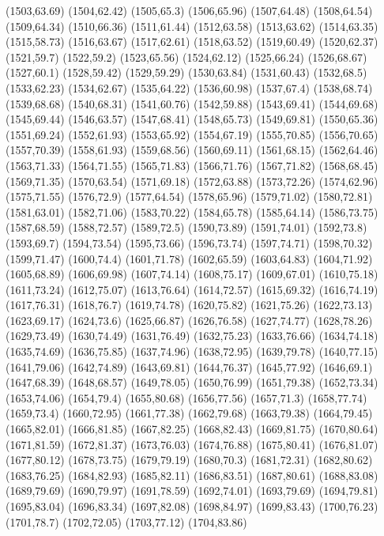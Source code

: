 (1503,63.69)
(1504,62.42)
(1505,65.3)
(1506,65.96)
(1507,64.48)
(1508,64.54)
(1509,64.34)
(1510,66.36)
(1511,61.44)
(1512,63.58)
(1513,63.62)
(1514,63.35)
(1515,58.73)
(1516,63.67)
(1517,62.61)
(1518,63.52)
(1519,60.49)
(1520,62.37)
(1521,59.7)
(1522,59.2)
(1523,65.56)
(1524,62.12)
(1525,66.24)
(1526,68.67)
(1527,60.1)
(1528,59.42)
(1529,59.29)
(1530,63.84)
(1531,60.43)
(1532,68.5)
(1533,62.23)
(1534,62.67)
(1535,64.22)
(1536,60.98)
(1537,67.4)
(1538,68.74)
(1539,68.68)
(1540,68.31)
(1541,60.76)
(1542,59.88)
(1543,69.41)
(1544,69.68)
(1545,69.44)
(1546,63.57)
(1547,68.41)
(1548,65.73)
(1549,69.81)
(1550,65.36)
(1551,69.24)
(1552,61.93)
(1553,65.92)
(1554,67.19)
(1555,70.85)
(1556,70.65)
(1557,70.39)
(1558,61.93)
(1559,68.56)
(1560,69.11)
(1561,68.15)
(1562,64.46)
(1563,71.33)
(1564,71.55)
(1565,71.83)
(1566,71.76)
(1567,71.82)
(1568,68.45)
(1569,71.35)
(1570,63.54)
(1571,69.18)
(1572,63.88)
(1573,72.26)
(1574,62.96)
(1575,71.55)
(1576,72.9)
(1577,64.54)
(1578,65.96)
(1579,71.02)
(1580,72.81)
(1581,63.01)
(1582,71.06)
(1583,70.22)
(1584,65.78)
(1585,64.14)
(1586,73.75)
(1587,68.59)
(1588,72.57)
(1589,72.5)
(1590,73.89)
(1591,74.01)
(1592,73.8)
(1593,69.7)
(1594,73.54)
(1595,73.66)
(1596,73.74)
(1597,74.71)
(1598,70.32)
(1599,71.47)
(1600,74.4)
(1601,71.78)
(1602,65.59)
(1603,64.83)
(1604,71.92)
(1605,68.89)
(1606,69.98)
(1607,74.14)
(1608,75.17)
(1609,67.01)
(1610,75.18)
(1611,73.24)
(1612,75.07)
(1613,76.64)
(1614,72.57)
(1615,69.32)
(1616,74.19)
(1617,76.31)
(1618,76.7)
(1619,74.78)
(1620,75.82)
(1621,75.26)
(1622,73.13)
(1623,69.17)
(1624,73.6)
(1625,66.87)
(1626,76.58)
(1627,74.77)
(1628,78.26)
(1629,73.49)
(1630,74.49)
(1631,76.49)
(1632,75.23)
(1633,76.66)
(1634,74.18)
(1635,74.69)
(1636,75.85)
(1637,74.96)
(1638,72.95)
(1639,79.78)
(1640,77.15)
(1641,79.06)
(1642,74.89)
(1643,69.81)
(1644,76.37)
(1645,77.92)
(1646,69.1)
(1647,68.39)
(1648,68.57)
(1649,78.05)
(1650,76.99)
(1651,79.38)
(1652,73.34)
(1653,74.06)
(1654,79.4)
(1655,80.68)
(1656,77.56)
(1657,71.3)
(1658,77.74)
(1659,73.4)
(1660,72.95)
(1661,77.38)
(1662,79.68)
(1663,79.38)
(1664,79.45)
(1665,82.01)
(1666,81.85)
(1667,82.25)
(1668,82.43)
(1669,81.75)
(1670,80.64)
(1671,81.59)
(1672,81.37)
(1673,76.03)
(1674,76.88)
(1675,80.41)
(1676,81.07)
(1677,80.12)
(1678,73.75)
(1679,79.19)
(1680,70.3)
(1681,72.31)
(1682,80.62)
(1683,76.25)
(1684,82.93)
(1685,82.11)
(1686,83.51)
(1687,80.61)
(1688,83.08)
(1689,79.69)
(1690,79.97)
(1691,78.59)
(1692,74.01)
(1693,79.69)
(1694,79.81)
(1695,83.04)
(1696,83.34)
(1697,82.08)
(1698,84.97)
(1699,83.43)
(1700,76.23)
(1701,78.7)
(1702,72.05)
(1703,77.12)
(1704,83.86)
